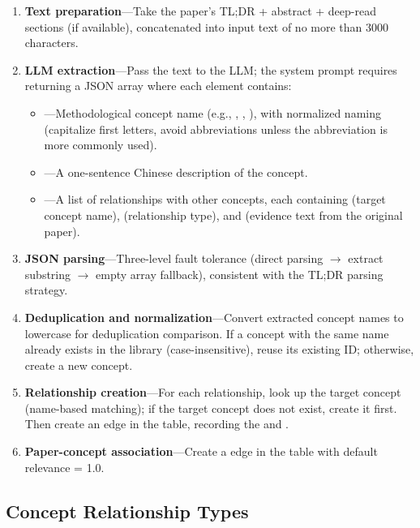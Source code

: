 \begin{enumerate}
  \item \textbf{Text preparation}---Take the paper's TL;DR + abstract + deep-read sections (if
    available), concatenated into input text of no more than 3000 characters.
  \item \textbf{LLM extraction}---Pass the text to the LLM; the system prompt requires returning
    a JSON array where each element contains:
    \begin{itemize}
      \item {}---Methodological concept name (e.g., , ,
        ), with normalized naming (capitalize first letters, avoid
        abbreviations unless the abbreviation is more commonly used).
      \item {}---A one-sentence Chinese description of the concept.
      \item {}---A list of relationships with other concepts, each containing
         (target concept name),  (relationship type), and
         (evidence text from the original paper).
    \end{itemize}
  \item \textbf{JSON parsing}---Three-level fault tolerance (direct parsing $\to$ extract
    \cmd{[...]} substring $\to$ empty array fallback), consistent with the TL;DR parsing strategy.
  \item \textbf{Deduplication and normalization}---Convert extracted concept names to lowercase for
    deduplication comparison. If a concept with the same name already exists in the library
    (case-insensitive), reuse its existing ID; otherwise, create a new concept.
  \item \textbf{Relationship creation}---For each relationship, look up the target concept
    (name-based matching); if the target concept does not exist, create it first. Then create an
    edge in the  table, recording the  and
    .
  \item \textbf{Paper-concept association}---Create a  edge in the
     table with default relevance = 1.0.
\end{enumerate}

\subsection{Concept Relationship Types}

